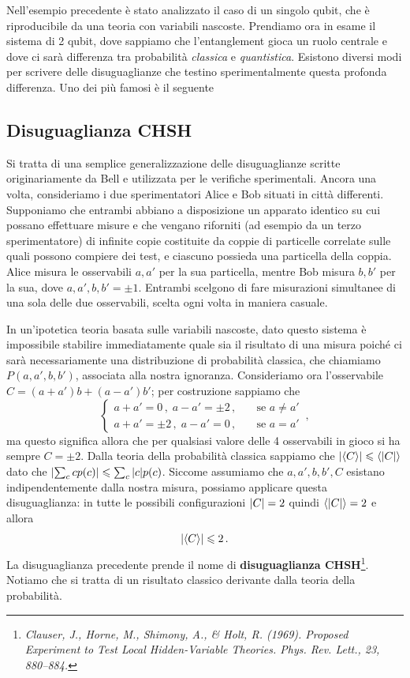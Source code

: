 \noindent Nell'esempio precedente è stato analizzato il caso di un singolo qubit, che \`e riproducibile da una teoria con variabili nascoste. Prendiamo ora in esame il sistema di 2 qubit, dove sappiamo che l'entanglement gioca un ruolo centrale e dove ci sar\`a  differenza tra probabilità \textit{classica} e \textit{quantistica}. Esistono diversi modi per scrivere delle disuguaglianze che testino sperimentalmente questa profonda differenza. Uno dei più famosi è il seguente

\subsection{Disuguaglianza CHSH}
Si tratta di una semplice generalizzazione delle  disuguaglianze scritte originariamente da Bell e utilizzata per le verifiche sperimentali. Ancora una volta, consideriamo i due sperimentatori Alice e Bob situati in città differenti. Supponiamo che entrambi abbiano a disposizione un apparato identico su cui possano effettuare misure e che vengano riforniti (ad esempio da un terzo sperimentatore) di infinite copie costituite da coppie di particelle correlate sulle quali possono compiere dei test, e ciascuno possieda una particella della coppia. Alice misura le osservabili $a,a'$ per la sua particella, mentre Bob misura $b,b'$ per la sua, dove $a,a',b,b' = \pm 1$. Entrambi scelgono di fare misurazioni simultanee di una sola delle due osservabili, scelta ogni volta in maniera casuale.

\noindent In un'ipotetica teoria basata sulle variabili nascoste, dato questo sistema è impossibile stabilire immediatamente quale sia il risultato di una misura poiché ci sarà necessariamente una distribuzione di probabilità classica, che chiamiamo $P(a,a',b,b')$, associata alla nostra ignoranza. Consideriamo ora l'osservabile $ C = (a+a') b + (a-a') b'$; per costruzione sappiamo che
\begin{equation*}
    \begin{cases}
        a+a' = 0 \, , \; a-a' = \pm 2 \, , \quad &\text{se } a \neq a' \\
        a+a' = \pm 2 \, , \; a - a' = 0 \, , \quad &\text{se } a = a'
    \end{cases} \, , 
\end{equation*}
ma questo significa allora che per qualsiasi valore delle 4 osservabili in gioco si ha sempre $C = \pm 2$. Dalla teoria della probabilità classica sappiamo che $\abs{\expval{C}} \leqslant \expval{\abs{C}}$ dato che $\abs{\sum_c c p(c)} \leqslant \sum_c \abs{c} p(c)$. Siccome assumiamo che $a,a',b,b',C$ esistano indipendentemente dalla nostra misura, possiamo applicare questa disuguaglianza: in tutte le possibili configurazioni $\abs{C} = 2$ quindi $\expval{\abs{C}} = 2$ e allora
\begin{equation}\label{CHSH_inequality}
    \abs{\expval{C}} \leqslant 2 \, .
\end{equation}
La disuguaglianza precedente prende il nome di \textbf{disuguaglianza CHSH}\footnote{\textit{Clauser, J., Horne, M., Shimony, A., \& Holt, R. (1969). Proposed Experiment to Test Local Hidden-Variable Theories. Phys. Rev. Lett., 23, 880–884.}}. Notiamo che si tratta di un risultato classico derivante dalla teoria della probabilità. 

